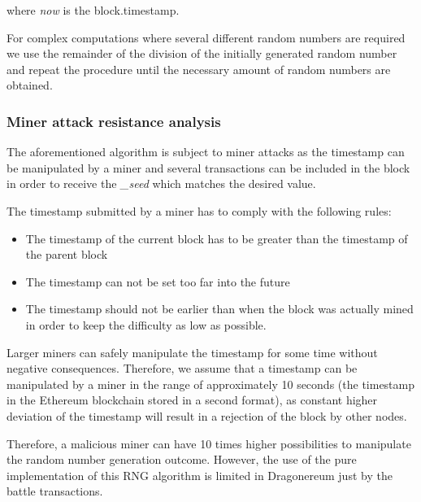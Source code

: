 \documentclass[12pt]{article}
\begin{document}
where\tab \textit{ now} is the block.timestamp.\par

For complex computations where several different random numbers are required we use the remainder of the division of the initially generated random number and repeat the procedure until the necessary amount of random numbers are obtained.\par

\vspace{\baselineskip}
\subsubsection{Miner attack resistance analysis}\label{Miner attack resistance analysis}  \par

The aforementioned algorithm is subject to miner attacks as the timestamp can be manipulated by a miner and several transactions can be included in the block in order to receive the \textit{\_seed }which matches the desired value.\par

The timestamp submitted by a miner has to comply with the following rules:\par

\begin{itemize}
	\item The timestamp of the current block has to be greater than the timestamp of the parent block\par

	\item The timestamp can not be set too far into the future\par

	\item The timestamp should not be earlier than when the block was actually mined in order to keep the difficulty as low as possible.
\end{itemize}\par

Larger miners can safely manipulate the timestamp for some time without negative consequences. Therefore, we assume that a timestamp can be manipulated by a miner in the range of approximately 10 seconds (the timestamp in the Ethereum blockchain stored in a second format), as constant higher deviation of the timestamp will result in a rejection of the block by other nodes. \par

Therefore, a malicious miner can have 10 times higher possibilities to manipulate the random number generation outcome. However, the use of the pure implementation of this RNG algorithm is limited in Dragonereum just by the battle transactions.\par
\end{document}
